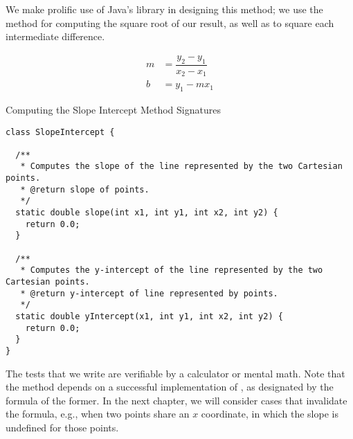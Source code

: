 We make prolific use of Java's  library in designing this method; we use the  method for computing the square root of our result, as well as  to square each intermediate difference.


\begin{align*}
m &= \dfrac{y_2-y_1}{x_2-x_1}\\
b &= y_1 - mx_1
\end{align*}

\begin{cl}{Computing the Slope Intercept Method Signatures}
\begin{lstlisting}[language=MyJava]
class SlopeIntercept {

  /**
   * Computes the slope of the line represented by the two Cartesian points.
   * @return slope of points.
   */
  static double slope(int x1, int y1, int x2, int y2) {
    return 0.0;
  }

  /**
   * Computes the y-intercept of the line represented by the two Cartesian points.
   * @return y-intercept of line represented by points.
   */
  static double yIntercept(x1, int y1, int x2, int y2) {
    return 0.0;
  }
}
\end{lstlisting}
\end{cl}

The tests that we write are verifiable by a calculator or mental math. Note that the  method depends on a successful implementation of , as designated by the formula of the former. In the next chapter, we will consider cases that invalidate the formula, e.g., when two points share an $x$ coordinate, in which the slope is undefined for those points.

